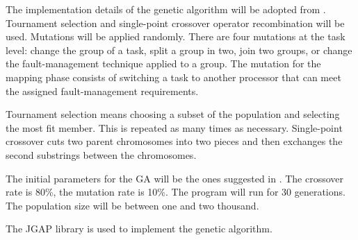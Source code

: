 The implementation details of the genetic algorithm will be adopted from \cite{bolchini2013reliability}. Tournament selection and single-point crossover operator recombination will be used. Mutations will be applied randomly. There are four mutations at the task level: change the group of a task, split a group in two, join two groups, or change the fault-management technique applied to a group. The mutation for the mapping phase consists of switching a task to another processor that can meet the assigned fault-management requirements.

Tournament selection means choosing a subset of the population and selecting the most fit member. This is repeated as many times as necessary. Single-point crossover cuts two parent chromosomes into two pieces and then exchanges the second substrings between the chromosomes. 

The initial parameters for the GA will be the ones suggested in \cite{bolchini2010multi}. The crossover rate is 80\%, the mutation rate is 10\%. The program will run for 30 generations. The population size will be between one and two thousand.

The JGAP library \cite{jgap} is used to implement the genetic algorithm. 



